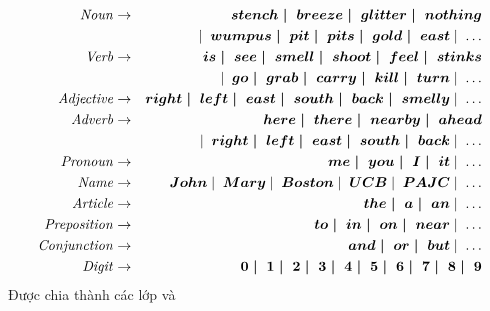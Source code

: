 \documentclass{article}
\begin{document}
\begin{huge}
\begin{eqnarray*}
{\it Noun} & \rightarrow & \mbox{\boldmath \( stench \mid\;breeze \mid\;glitter \mid\;nothing \)} \\
        & &\mid\; \mbox{\boldmath \( wumpus \mid\;pit \mid\;pits\mid\;gold \mid\;east \)} \mid\; \ldots \\
{\it Verb} & \rightarrow & \mbox{\boldmath \( is \mid\;see \mid\;smell \mid\;shoot \mid\;feel \mid\;stinks \)}\\
        & &\mid\; \mbox{\boldmath \( go \mid\;grab \mid\;carry \mid\;kill \mid\;turn \)} \mid\; \ldots \\
{\it Adjective} & \rightarrow & \mbox{\boldmath \( right \mid\;left \mid\;east \mid\;south \mid\;back \mid\;smelly \)} \mid\; \ldots \\
{\it Adverb} & \rightarrow & \mbox{\boldmath \( here \mid\;there \mid\;nearby \mid\;ahead \)} \\
        &&\mid\; \mbox{\boldmath \( right \mid\;left \mid\;east \mid\;south \mid\;back \)} \mid\; \ldots \\
{\it Pronoun} & \rightarrow & \mbox{\boldmath \( me \mid\;you \mid\;I \mid\;it \)} \mid\; \ldots \\
{\it Name} & \rightarrow & \mbox{\boldmath \( John \)} \mid\; \mbox{\boldmath \( Mary \)} \mid\; \mbox{\boldmath \( Boston \)}
	\mid\; \mbox{\boldmath \( UCB \)} \mid\; \mbox{\boldmath \( PAJC \)} \mid\; \ldots \\
{\it Article} & \rightarrow & \mbox{\boldmath \( the \mid\;a \mid\;an \)} \mid\; \ldots \\
{\it Preposition} & \rightarrow & \mbox{\boldmath \( to \mid\;in \mid\;on \mid\;near \)} \mid\; \ldots \\
{\it Conjunction} & \rightarrow & \mbox{\boldmath \( and \mid\;or \mid\;but \)} \mid\; \ldots \\
{\it Digit} & \rightarrow & \mbox{\boldmath \( 0\mid\;1\mid\;2\mid\;3\mid\;4\mid\;5\mid\;6\mid\;7\mid\;8\mid\;9 \)}
\end{eqnarray*}
Được chia thành các lớp  và 


\vspace*{-0.5in}


\end{huge}
\end{document}

